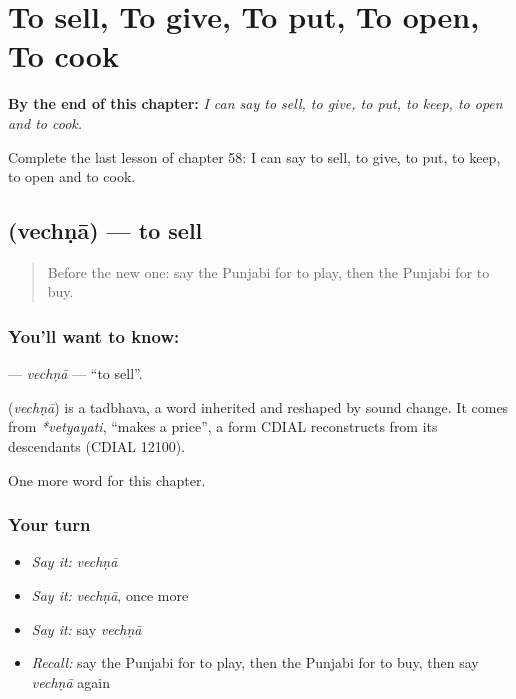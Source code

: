 
\chapter{To sell, To give, To put, To open, To cook}
\label{ch:pa-to-sell-to-give-to-put-to-open-to-cook}

\begin{chapteropening}
\textbf{By the end of this chapter:} \emph{I can say to sell, to give, to put, to keep, to open and to cook.}

Complete the last lesson of chapter 58: I can say to sell, to give, to put, to keep, to open and to cook.
\end{chapteropening}

\section[\texorpdfstring{\pa{ਵੇਚਣਾ} (vechṇā)}{ਵੇਚਣਾ (vechṇā)}]{ (vechṇā) — to sell}

\label{lesson:PA-C58-vechna}



\begin{quote}
Before the new one: say the Punjabi for to play, then the Punjabi for to buy.
\end{quote}

\subsection*{You'll want to know: }
\textbf{} — \emph{vechṇā} — \textquotedblleft{}to sell\textquotedblright{}.

\begin{cousinweb}
\textbf{} (\emph{vechṇā}) is a tadbhava, a word inherited and reshaped by sound change. It comes from \emph{*vetyayati}, \textquotedblleft{}makes a price\textquotedblright{}, a form CDIAL reconstructs from its descendants (CDIAL 12100).
\end{cousinweb}

\begin{grammarlens}[title={What you've built}]
One more word for this chapter.
\end{grammarlens}

\subsection*{Your turn}
\begin{itemize}
\raggedright
  \item \emph{Say it:} \emph{vechṇā}
  \item \emph{Say it:} \emph{vechṇā}, once more
  \item \emph{Say it:} say \emph{vechṇā}
  \item \emph{Recall:} say the Punjabi for to play, then the Punjabi for to buy, then say \emph{vechṇā} again
\end{itemize}

